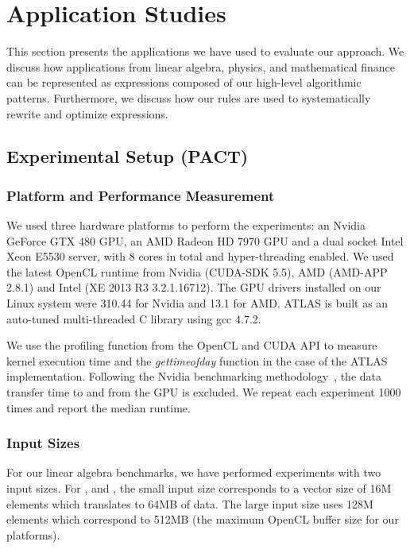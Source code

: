 
\chapter{Application Studies}

\label{ch:sixth} %

This section presents the applications we have used to evaluate our approach.
We discuss how applications from linear algebra, physics, and mathematical finance can be represented as expressions composed of our high-level algorithmic patterns.
Furthermore, we discuss how our rules are used to systematically rewrite and optimize expressions.

\section{Experimental Setup (PACT)}
\subsection{Platform and Performance Measurement}

We used three hardware platforms to perform the experiments: an Nvidia GeForce GTX 480 GPU, an AMD Radeon HD 7970 GPU and a dual socket Intel Xeon E5530 server, with 8 cores in total and hyper-threading enabled.
We used the latest OpenCL runtime from Nvidia (CUDA-SDK 5.5), AMD (AMD-APP 2.8.1) and Intel (XE 2013 R3 3.2.1.16712).
The GPU drivers installed on our Linux system were 310.44 for Nvidia and 13.1 for AMD.
ATLAS is built as an auto-tuned multi-threaded C library using gcc 4.7.2. 

We use the profiling function from the OpenCL and CUDA API to measure kernel execution time and the \textit{gettimeofday} function in the case of the ATLAS implementation.
Following the Nvidia benchmarking methodology~\cite{Harris07reduction}, the data transfer time to and from the GPU is excluded.
We repeat each experiment 1000 times and report the median runtime.

\subsection{Input Sizes}

For our linear algebra benchmarks, we have performed experiments with two input sizes.
For ,  and , the small input size corresponds to a vector size of 16M elements which translates to 64MB of data.
The large input size uses 128M elements which correspond to 512MB (the maximum OpenCL buffer size for our platforms).

